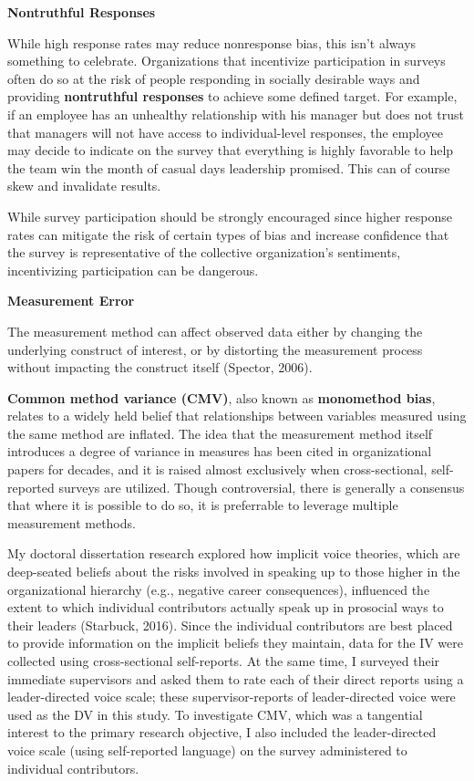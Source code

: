 \documentclass[
]{book}
\begin{document}
\textbf{Nontruthful Responses}

While high response rates may reduce nonresponse bias, this isn't always something to celebrate. Organizations that incentivize participation in surveys often do so at the risk of people responding in socially desirable ways and providing \textbf{nontruthful responses} to achieve some defined target. For example, if an employee has an unhealthy relationship with his manager but does not trust that managers will not have access to individual-level responses, the employee may decide to indicate on the survey that everything is highly favorable to help the team win the month of casual days leadership promised. This can of course skew and invalidate results.

While survey participation should be strongly encouraged since higher response rates can mitigate the risk of certain types of bias and increase confidence that the survey is representative of the collective organization's sentiments, incentivizing participation can be dangerous.

\textbf{Measurement Error}

The measurement method can affect observed data either by changing the underlying construct of interest, or by distorting the measurement process without impacting the construct itself (Spector, 2006).

\textbf{Common method variance (CMV)}, also known as \textbf{monomethod bias}, relates to a widely held belief that relationships between variables measured using the same method are inflated. The idea that the measurement method itself introduces a degree of variance in measures has been cited in organizational papers for decades, and it is raised almost exclusively when cross-sectional, self-reported surveys are utilized. Though controversial, there is generally a consensus that where it is possible to do so, it is preferrable to leverage multiple measurement methods.

My doctoral dissertation research explored how implicit voice theories, which are deep-seated beliefs about the risks involved in speaking up to those higher in the organizational hierarchy (e.g., negative career consequences), influenced the extent to which individual contributors actually speak up in prosocial ways to their leaders (Starbuck, 2016). Since the individual contributors are best placed to provide information on the implicit beliefs they maintain, data for the IV were collected using cross-sectional self-reports. At the same time, I surveyed their immediate supervisors and asked them to rate each of their direct reports using a leader-directed voice scale; these supervisor-reports of leader-directed voice were used as the DV in this study. To investigate CMV, which was a tangential interest to the primary research objective, I also included the leader-directed voice scale (using self-reported language) on the survey administered to individual contributors.
\end{document}
